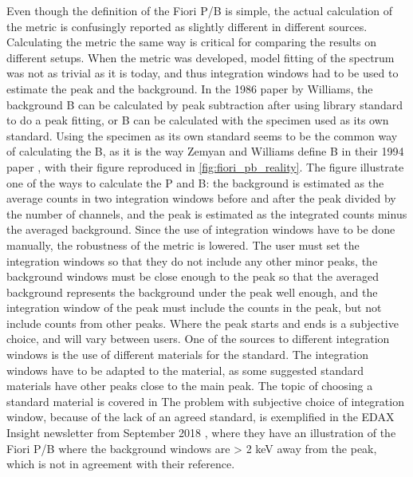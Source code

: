 Even though the definition of the Fiori P/B is simple, the actual calculation of the metric is confusingly reported as slightly different in different sources.
Calculating the metric the same way is critical for comparing the results on different setups.
When the metric was developed, model fitting of the spectrum was not as trivial as it is today, and thus integration windows had to be used to estimate the peak and the background.
In the 1986 paper by Williams, the background B can be calculated by peak subtraction after using library standard to do a peak fitting, or B can be calculated with the specimen used as its own standard.
Using the specimen as its own standard seems to be the common way of calculating the B, as it is the way Zemyan and Williams define B in their 1994 paper \cite{zemyan_standard_performance_1994}, with their figure reproduced in \cref{fig:fiori_pb_reality}.
The figure illustrate one of the ways to calculate the P and B: the background is estimated as the average counts in two integration windows before and after the peak divided by the number of channels, and the peak is estimated as the integrated counts minus the averaged background.
Since the use of integration windows have to be done manually, the robustness of the metric is lowered.
The user must set the integration windows so that they do not include any other minor peaks, the background windows must be close enough to the peak so that the averaged background represents the background under the peak well enough, and the integration window of the peak must include the counts in the peak, but not include counts from other peaks.
Where the peak starts and ends is a subjective choice, and will vary between users.
One of the sources to different integration windows is the use of different materials for the standard.
The integration windows have to be adapted to the material, as some suggested standard materials have other peaks close to the main peak.
The topic of choosing a standard material is covered in 
The problem with subjective choice of integration window, because of the lack of an agreed standard, is exemplified in the EDAX Insight newsletter from September 2018 \cite{edax_insight_2018}, where they have an illustration of the Fiori P/B where the background windows are > 2 keV away from the peak, which is not in agreement with their reference.

